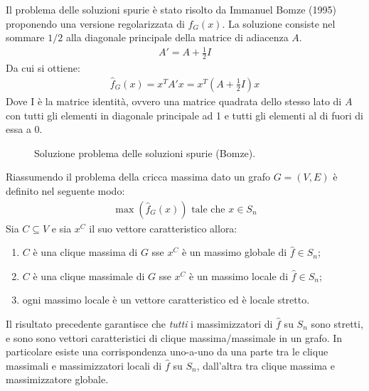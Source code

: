 	Il problema delle soluzioni spurie è stato risolto da Immanuel Bomze (1995) proponendo una versione regolarizzata di $f_G(x)$. La soluzione consiste nel sommare $1/2$ alla diagonale principale della matrice di adiacenza $A$.
	\begin{align*}
		A' = A + \frac{1}{2} I
	\end{align*}
	Da cui si ottiene:
	\begin{align*}
		\hat{f}_G(x) = x^T A' x = x^T \left( A + \frac{1}{2} I \right) x 
	\end{align*}
	Dove I è la matrice identità, ovvero una matrice quadrata dello stesso lato di $A$ con tutti gli elementi in diagonale principale ad 1 e tutti gli elementi al di fuori di essa a 0.\\


	\begin{figure}[h!]
		\centering
		\caption{Soluzione problema delle soluzioni spurie (Bomze).}
	\end{figure}

	Riassumendo il problema della cricca massima dato un grafo $G = (V, E)$ è definito nel seguente modo:
	\begin{align*}
		\max(\hat{f}_G(x)) \text{ tale che } x \in S_n
	\end{align*}
	Sia $C \subseteq V$ e sia $x^C$ il suo vettore caratteristico allora:
	\begin{enumerate}
		\item $C$ è una clique massima di $G$ sse $x^C$ è un massimo globale di $\hat{f} \in S_n$;
		\item $C$ è una clique massimale di $G$ sse $x^C$ è un massimo locale di $\hat{f} \in S_n$;
		\item ogni massimo locale è un vettore caratteristico ed è locale stretto. 
	\end{enumerate}

	\newpage

	Il risultato precedente garantisce che \emph{tutti} i massimizzatori di $\hat{f}$ su $S_n$ sono stretti, e sono sono vettori caratteristici di clique massima/massimale in un grafo. In particolare esiste una corrispondenza uno-a-uno da una parte tra le clique massimali e massimizzatori locali di $\hat{f}$ su $S_n$, dall'altra tra clique massima e massimizzatore globale.



